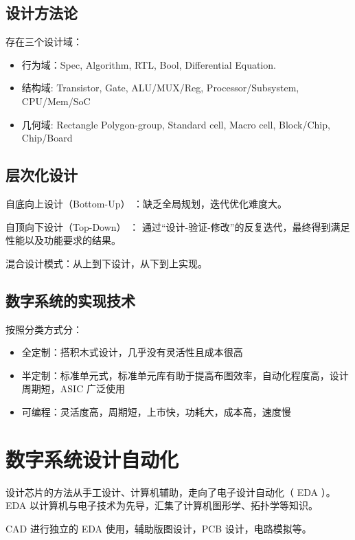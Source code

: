 \documentclass[cn,11pt,chinese,black,simple]{../elegantbook}
\begin{document}
\subsection{设计方法论}

存在三个设计域：

\begin{itemize}
    \item 行为域：Spec, Algorithm, RTL, Bool, Differential Equation.
    \item 结构域: Transistor, Gate, ALU/MUX/Reg, Processor/Subsystem, CPU/Mem/SoC 
    \item 几何域: Rectangle Polygon-group, Standard cell, Macro cell, Block/Chip, Chip/Board
\end{itemize}

\subsection{层次化设计}

自底向上设计（Bottom-Up） ：缺乏全局规划，迭代优化难度大。

自顶向下设计（Top-Down） ： 通过“设计-验证-修改”的反复迭代，最终得到满足性能以及功能要求的结果。

混合设计模式：从上到下设计，从下到上实现。

\subsection{数字系统的实现技术}

按照分类方式分：

\begin{itemize}
    \item 全定制：搭积木式设计，几乎没有灵活性且成本很高
    \item 半定制：标准单元式，标准单元库有助于提高布图效率，自动化程度高，设计周期短，ASIC 广泛使用
    \item 可编程：灵活度高，周期短，上市快，功耗大，成本高，速度慢
\end{itemize}

\section{数字系统设计自动化}

设计芯片的方法从手工设计、计算机辅助，走向了电子设计自动化（ EDA ）。EDA 以计算机与电子技术为先导，汇集了计算机图形学、拓扑学等知识。

CAD 进行独立的 EDA 使用，辅助版图设计，PCB 设计，电路模拟等。
\end{document}
